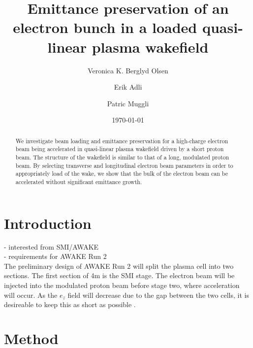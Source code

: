 \documentclass[aps,prstab,reprint,groupedaddress]{revtex4-1}
\begin{document}

\title{Emittance preservation of an electron bunch in a loaded quasi-linear plasma wakefield}

\author{Veronica K. Berglyd Olsen}

\author{Erik Adli}

\author{Patric Muggli}

\date{\today}

\begin{abstract}
We investigate beam loading and emittance preservation for a high-charge electron beam being accelerated in quasi-linear plasma wakefield driven by a short proton beam. The structure of the wakefield is similar to that of a long, modulated proton beam. By selecting transverse and longitudinal electron beam parameters in order to  appropriately load of the wake, we show that the bulk of the electron beam can be accelerated without significant emittance growth.
\end{abstract}

\maketitle

\section[\label{S:I}]{Introduction}

- interested from SMI/AWAKE \\
- requirements for AWAKE Run 2 \\
The preliminary design of AWAKE Run 2 will split the plasma cell into two sections. The first section of 4m is the SMI stage. The electron beam will be injected into the modulated proton beam before stage two, where acceleration will occur. As the $e_z$ field will decrease due to the gap between the two cells, it is desireable to keep this as short as possible \cite{adli_towards_2016}.

\section[\label{S:M}]{Method}
\end{document}
